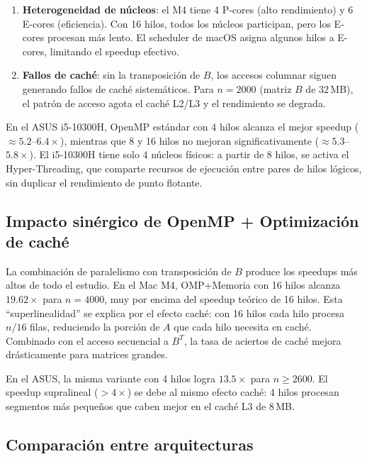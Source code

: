 \documentclass{article}
\begin{document}
\begin{enumerate}
    \item \textbf{Heterogeneidad de núcleos}: el M4 tiene 4 P-cores (alto rendimiento) y 6 E-cores (eficiencia). Con 16 hilos, todos los núcleos participan, pero los E-cores procesan más lento. El scheduler de macOS asigna algunos hilos a E-cores, limitando el speedup efectivo.
    \item \textbf{Fallos de caché}: sin la transposición de $B$, los accesos columnar siguen generando fallos de caché sistemáticos. Para $n=2000$ (matriz $B$ de 32\,MB), el patrón de acceso agota el caché L2/L3 y el rendimiento se degrada.
\end{enumerate}

En el ASUS i5-10300H, OpenMP estándar con 4 hilos alcanza el mejor speedup ($\approx 5.2$--$6.4\times$), mientras que 8 y 16 hilos no mejoran significativamente ($\approx 5.3$--$5.8\times$). El i5-10300H tiene solo 4 núcleos físicos: a partir de 8 hilos, se activa el Hyper-Threading, que comparte recursos de ejecución entre pares de hilos lógicos, sin duplicar el rendimiento de punto flotante.

\subsection{Impacto sinérgico de OpenMP + Optimización de caché}

La combinación de paralelismo con transposición de $B$ produce los speedups más altos de todo el estudio. En el Mac M4, OMP+Memoria con 16 hilos alcanza $19.62\times$ para $n=4000$, muy por encima del speedup teórico de 16 hilos. Esta ``superlinealidad'' se explica por el efecto caché: con 16 hilos cada hilo procesa $n/16$ filas, reduciendo la porción de $A$ que cada hilo necesita en caché. Combinado con el acceso secuencial a $B^T$, la tasa de aciertos de caché mejora drásticamente para matrices grandes.

En el ASUS, la misma variante con 4 hilos logra $13.5\times$ para $n \geq 2600$. El speedup supralineal ($>4\times$) se debe al mismo efecto caché: 4 hilos procesan segmentos más pequeños que caben mejor en el caché L3 de 8\,MB.

\subsection{Comparación entre arquitecturas}
\end{document}
